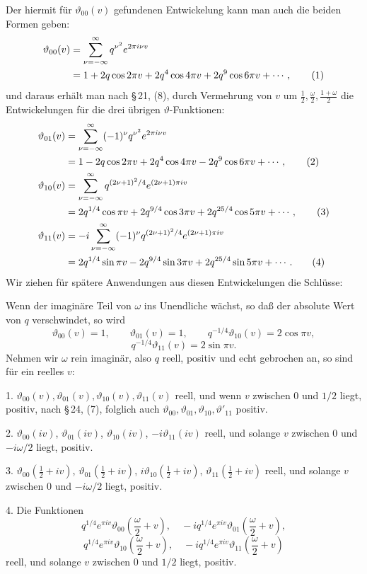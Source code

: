\documentclass[11pt]{article}
\providecommand{\tht}{\vartheta}
\begin{document}
Der hiermit für $\tht_{00}(v)$ gefundenen Entwickelung kann man auch die beiden Formen geben:
\begin{align}
\tht_{00}(v)&=\sum_{\nu=-\infty}^{\infty}q^{\nu^2}e^{2\pi i\nu v} \notag\\
&=1+2q\cos2\pi v+2q^4\cos4\pi v+2q^9\cos6\pi v+\cdots, \tag{1}
\end{align}
und daraus erhält man nach \S\,21, (8), durch Vermehrung von $v$ um $\frac12,\frac\omega2,\frac{1+\omega}{2}$ die Entwickelungen für die drei übrigen $\vartheta$-Funktionen:
\begin{align}
\tht_{01}(v)&=\sum_{\nu=-\infty}^{\infty}(-1)^\nu q^{\nu^2}e^{2\pi i\nu v} \notag\\
&=1-2q\cos2\pi v+2q^4\cos4\pi v-2q^9\cos6\pi v+\cdots, \tag{2}\\
\tht_{10}(v)&=\sum_{\nu=-\infty}^{\infty}q^{(2\nu+1)^2/4}e^{(2\nu+1)\pi iv} \notag\\
&=2q^{1/4}\cos\pi v+2q^{9/4}\cos3\pi v+2q^{25/4}\cos5\pi v+\cdots, \tag{3}\\
\tht_{11}(v)&=-i\sum_{\nu=-\infty}^{\infty}(-1)^\nu q^{(2\nu+1)^2/4}e^{(2\nu+1)\pi iv} \notag\\
&=2q^{1/4}\sin\pi v-2q^{9/4}\sin3\pi v+2q^{25/4}\sin5\pi v+\cdots. \tag{4}
\end{align}
Wir ziehen für spätere Anwendungen aus diesen Entwickelungen die Schlüsse:

Wenn der imaginäre Teil von $\omega$ ins Unendliche wächst, so daß der absolute Wert von $q$ verschwindet, so wird
\[
\tht_{00}(v)=1,
\qquad
\tht_{01}(v)=1,
\qquad
q^{-1/4}\tht_{10}(v)=2\cos\pi v,
\]
\[
q^{-1/4}\tht_{11}(v)=2\sin\pi v.
\]
Nehmen wir $\omega$ rein imaginär, also $q$ reell, positiv und echt gebrochen an, so sind für ein reelles $v$:

1. $\tht_{00}(v),\tht_{01}(v),\tht_{10}(v),\tht_{11}(v)$ reell, und wenn $v$ zwischen $0$ und $1/2$ liegt, positiv, nach \S\,24, (7), folglich auch $\tht_{00},\tht_{01},\tht_{10},\tht'_{11}$ positiv.

2. $\tht_{00}(iv)$, $\tht_{01}(iv)$, $\tht_{10}(iv)$, $-i\tht_{11}(iv)$ reell, und solange $v$ zwischen $0$ und $-i\omega/2$ liegt, positiv.

3. $\tht_{00}(\frac12+iv)$, $\tht_{01}(\frac12+iv)$, $i\tht_{10}(\frac12+iv)$, $\tht_{11}(\frac12+iv)$ reell, und solange $v$ zwischen $0$ und $-i\omega/2$ liegt, positiv.

4. Die Funktionen
\[
q^{1/4}e^{\pi iv}\tht_{00}\left(\frac\omega2+v\right),\quad
-iq^{1/4}e^{\pi iv}\tht_{01}\left(\frac\omega2+v\right),
\]
\[
q^{1/4}e^{\pi iv}\tht_{10}\left(\frac\omega2+v\right),\quad
-iq^{1/4}e^{\pi iv}\tht_{11}\left(\frac\omega2+v\right)
\]
reell, und solange $v$ zwischen $0$ und $1/2$ liegt, positiv.
\end{document}
